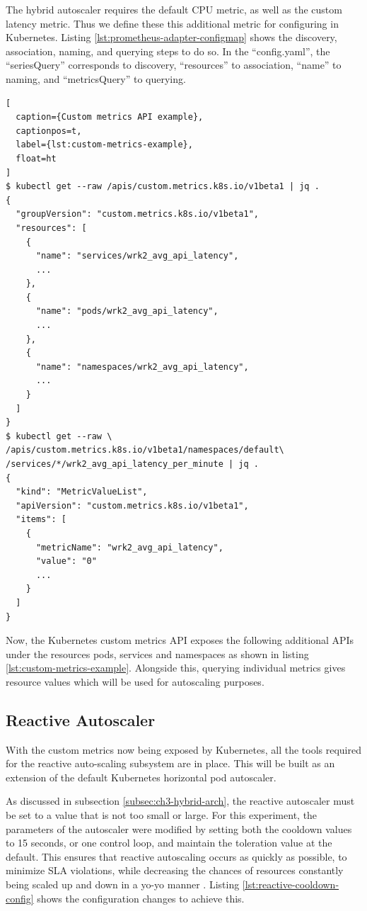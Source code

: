 The hybrid autoscaler requires the default CPU metric, as well as the custom latency metric. Thus we define these this additional metric for configuring in Kubernetes. Listing \ref{lst:prometheus-adapter-configmap} shows the discovery, association, naming, and querying steps to do so. In the ``config.yaml'', the ``seriesQuery'' corresponds to discovery, ``resources'' to association, ``name'' to naming, and ``metricsQuery'' to querying.

\begin{lstlisting}[
  caption={Custom metrics API example},
  captionpos=t,
  label={lst:custom-metrics-example},
  float=ht
]
$ kubectl get --raw /apis/custom.metrics.k8s.io/v1beta1 | jq .
{
  "groupVersion": "custom.metrics.k8s.io/v1beta1",
  "resources": [
    {
      "name": "services/wrk2_avg_api_latency",
      ...
    },
    {
      "name": "pods/wrk2_avg_api_latency",
      ...
    },
    {
      "name": "namespaces/wrk2_avg_api_latency",
      ...
    }
  ]
}
$ kubectl get --raw \
/apis/custom.metrics.k8s.io/v1beta1/namespaces/default\
/services/*/wrk2_avg_api_latency_per_minute | jq .
{
  "kind": "MetricValueList",
  "apiVersion": "custom.metrics.k8s.io/v1beta1",
  "items": [
    {
      "metricName": "wrk2_avg_api_latency",
      "value": "0"
      ...
    }
  ]
}
\end{lstlisting}

Now, the Kubernetes custom metrics API exposes the following additional APIs under the resources pods, services and namespaces as shown in listing \ref{lst:custom-metrics-example}. Alongside this, querying individual metrics gives resource values which will be used for autoscaling purposes.

\subsection{Reactive Autoscaler}
\label{subsec:reactive-auto-subsection}

With the custom metrics now being exposed by Kubernetes, all the tools required for the reactive auto-scaling subsystem are in place. This will be built as an extension of the default Kubernetes horizontal pod autoscaler.\par

As discussed in subsection \ref{subsec:ch3-hybrid-arch}, the reactive autoscaler must be set to a value that is not too small or large. For this experiment, the parameters of the autoscaler were modified by setting both the cooldown values to 15 seconds, or one control loop, and maintain the toleration value at the default. This ensures that reactive autoscaling occurs as quickly as possible, to minimize SLA violations, while decreasing the chances of resources constantly being scaled up and down in a yo-yo manner \cite{sides2015yo}. Listing \ref{lst:reactive-cooldown-config} shows the configuration changes to achieve this.\par

